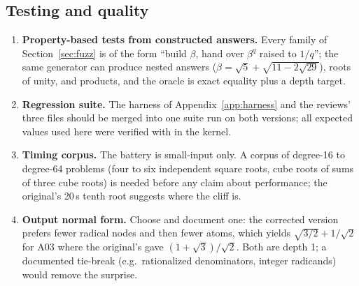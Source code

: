 \subsection{Testing and quality}
\begin{enumerate}
\item \textbf{Property-based tests from constructed answers.} Every family of
      Section~\ref{sec:fuzz} is of the form ``build $\beta$, hand over
      $\beta^q$ raised to $1/q$''; the same generator can produce nested
      answers ($\beta=\sqrt5+\sqrt{11-2\sqrt{29}}$), roots of unity, and
      products, and the oracle is exact equality plus a depth target.
\item \textbf{Regression suite.} The harness of Appendix~\ref{app:harness}
      and the reviews' three  files should be merged into one
       suite run on both versions; all expected values used
      here were verified with  in the kernel.
\item \textbf{Timing corpus.} The battery is small-input only. A corpus of
      degree-16 to degree-64 problems (four to six independent square roots,
      cube roots of sums of three cube roots) is needed before any claim about
      performance; the original's 20\,s tenth root suggests where the cliff is.
\item \textbf{Output normal form.} Choose and document one: the corrected
      version prefers fewer radical nodes and then fewer atoms, which yields
      $\sqrt{3/2}+1/\sqrt2$ for A03 where the original's  gave
      $(1+\sqrt3)/\sqrt2$. Both are depth 1; a documented tie-break (e.g.\
      rationalized denominators, integer radicands) would remove the surprise.
\end{enumerate}
